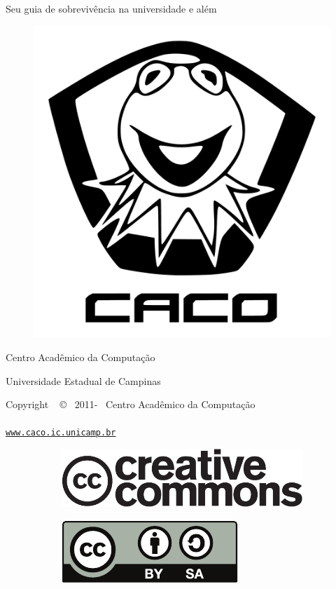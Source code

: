 \documentclass[a4paper,10pt,oldfontcommands]{memoir}
\renewcommand{\url}[1]{\href{http://#1}{\nolinkurl{#1}}}
\begin{document}
\begin{center}
\textsf{\huge Seu guia de sobrevivência na universidade e além}

\vfill %

\begin{figure}[H]
    \centering
    \includegraphics[width=.4\textwidth]{img/caco_logo.pdf}
\end{figure}


Centro Acadêmico da Computação

Universidade Estadual de Campinas

\the\year
\clearpage

Copyright ~ \copyright ~ 2011-\the\year ~ Centro Acadêmico da Computação

\paragraph{}
\url{www.caco.ic.unicamp.br}


\begin{figure}[h]
\centering
\begin{subfigure}{0.4\textwidth}
    \centering
    \includegraphics[width=\textwidth]{img/cc_logo.pdf}
\end{subfigure}
\qquad
\begin{subfigure}{0.25\textwidth}
    \centering
    \includegraphics[width=\textwidth]{img/by-sa.pdf}
\end{subfigure}
\end{figure}


\end{center}
\end{document}
